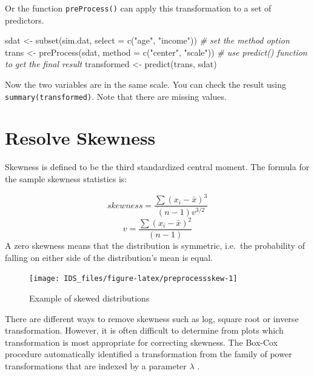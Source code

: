 \documentclass[
  12pt,
]{krantz}
\makeatletter
\newenvironment{Shaded}{\begin{snugshade}}{\end{snugshade}}
\newcommand{\AttributeTok}[1]{\textcolor[rgb]{0.61,0.61,0.61}{#1}}
\newcommand{\CommentTok}[1]{\textcolor[rgb]{0.37,0.37,0.37}{\textit{#1}}}
\newcommand{\FunctionTok}[1]{\textcolor[rgb]{0,0,0}{#1}}
\newcommand{\NormalTok}[1]{#1}
\newcommand{\OtherTok}[1]{\textcolor[rgb]{0.37,0.37,0.37}{#1}}
\newcommand{\StringTok}[1]{\textcolor[rgb]{0.5,0.5,0.5}{#1}}
\newenvironment{kframe}{%
\medskip{}
\setlength{\fboxsep}{.8em}
 \def\at@end@of@kframe{}%
 \ifinner\ifhmode%
  \def\at@end@of@kframe{\end{minipage}}%
  \begin{minipage}{\columnwidth}%
 \fi\fi%
 \def\FrameCommand##1{\hskip\@totalleftmargin \hskip-\fboxsep
 \colorbox{shadecolor}{##1}\hskip-\fboxsep
     \hskip-\linewidth \hskip-\@totalleftmargin \hskip\columnwidth}%
 \MakeFramed {\advance\hsize-\width
   \@totalleftmargin\z@ \linewidth\hsize
   \@setminipage}}%
 {\par\unskip\endMakeFramed%
 \at@end@of@kframe}
\renewenvironment{Shaded}{\begin{kframe}}{\end{kframe}}
\makeatother
\begin{document}
Or the function \texttt{preProcess()} can apply this transformation to a set of predictors.

\begin{Shaded}
\begin{Highlighting}[]
\NormalTok{sdat }\OtherTok{\textless{}{-}} \FunctionTok{subset}\NormalTok{(sim.dat, }\AttributeTok{select =} \FunctionTok{c}\NormalTok{(}\StringTok{"age"}\NormalTok{, }\StringTok{"income"}\NormalTok{))}
\CommentTok{\# set the \textquotesingle{}method\textquotesingle{} option}
\NormalTok{trans }\OtherTok{\textless{}{-}} \FunctionTok{preProcess}\NormalTok{(sdat, }\AttributeTok{method =} \FunctionTok{c}\NormalTok{(}\StringTok{"center"}\NormalTok{, }\StringTok{"scale"}\NormalTok{))}
\CommentTok{\# use predict() function to get the final result}
\NormalTok{transformed }\OtherTok{\textless{}{-}} \FunctionTok{predict}\NormalTok{(trans, sdat)}
\end{Highlighting}
\end{Shaded}

Now the two variables are in the same scale. You can check the result using \texttt{summary(transformed)}. Note that there are missing values.

\hypertarget{resolve-skewness}{%
\section{Resolve Skewness}\label{resolve-skewness}}

Skewness is defined to be the third standardized central moment. The formula for the sample skewness statistics is:

\[ skewness=\frac{\sum(x_{i}-\bar{x})^{3}}{(n-1)v^{3/2}}\]
\[v=\frac{\sum(x_{i}-\bar{x})^{2}}{(n-1)}\]
A zero skewness means that the distribution is symmetric, i.e.~the probability of falling on either side of the distribution's mean is equal.

\begin{figure}

{\centering \texttt{[image: IDS\_files/figure-latex/preprocessskew-1]} 

}

\caption{Example of skewed distributions}\label{fig:preprocessskew}
\end{figure}

There are different ways to remove skewness such as log, square root or inverse transformation. However, it is often difficult to determine from plots which transformation is most appropriate for correcting skewness. The Box-Cox procedure automatically identified a transformation from the family of power transformations that are indexed by a parameter \(\lambda\) \citep{BOXCOX1}.
\end{document}
